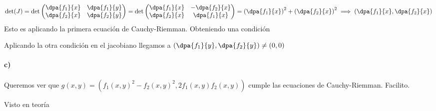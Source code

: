   \begin{problem}[13]
  \solution
  
  $$\det(J) = \det \begin{pmatrix}
              \dpa{f_1}{x}&\dpa{f_1}{y}\\
              \dpa{f_2}{x}&\dpa{f_2}{y}
             \end{pmatrix} = 
             \det \begin{pmatrix}
              \dpa{f_1}{x}&-\dpa{f_2}{x}\\
              \dpa{f_2}{x}& \dpa{f_1}{x}
             \end{pmatrix}
      = \left(\dpa{f_1}{x}\right)^2 + \left(\dpa{f_2}{x}\right)^2 \implies \left(\dpa{f_1}{x},\dpa{f_2}{x}\right)$$
Esto es aplicando la primera ecuación de Cauchy-Riemman. Obteniendo una condición

Aplicando la otra condición en el jacobiano llegamos a $\displaystyle\left(\dpa{f_1}{y},\dpa{f_2}{y}\right)\neq (0,0)$
\paragraph{c)}

Queremos ver que $g(x,y) = (f_1(x,y)^2-f_2(x,y)^2,2f_1(x,y)f_2(x,y))$ cumple las ecuaciones de Cauchy-Riemman. Facilito.
\end{problem}


 \begin{problem}[14]
 \solution
 Visto en teoría
 \end{problem}
 
